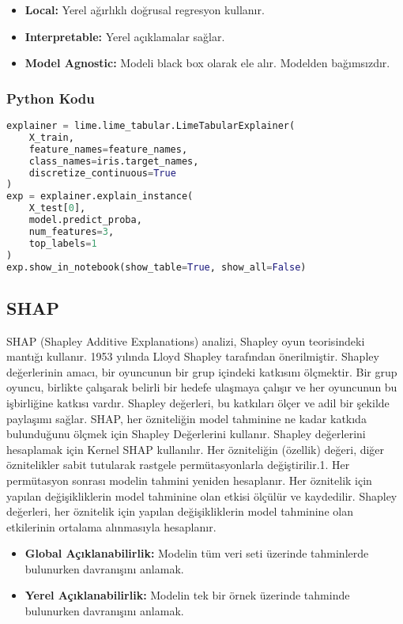 \begin{itemize}
    \item \textbf{Local:} Yerel ağırlıklı doğrusal regresyon kullanır.
    \item \textbf{Interpretable:} Yerel açıklamalar sağlar.
    \item \textbf{Model Agnostic:} Modeli black box olarak ele alır. Modelden bağımsızdır.
\end{itemize}

\subsubsection{Python Kodu}

\begin{lstlisting}[language=Python]
explainer = lime.lime_tabular.LimeTabularExplainer(
	X_train, 
	feature_names=feature_names, 
	class_names=iris.target_names, 
	discretize_continuous=True
)
exp = explainer.explain_instance(
	X_test[0], 
	model.predict_proba, 
	num_features=3, 
	top_labels=1
)
exp.show_in_notebook(show_table=True, show_all=False)
\end{lstlisting}

\newpage

\subsection{SHAP}
SHAP (Shapley Additive Explanations) analizi, Shapley oyun teorisindeki mantığı kullanır. 1953 yılında Lloyd Shapley tarafından önerilmiştir. Shapley değerlerinin amacı, bir oyuncunun bir grup içindeki katkısını ölçmektir. Bir grup oyuncu, birlikte çalışarak belirli bir hedefe ulaşmaya çalışır ve her oyuncunun bu işbirliğine katkısı vardır. Shapley değerleri, bu katkıları ölçer ve adil bir şekilde paylaşımı sağlar. SHAP, her özniteliğin model tahminine ne kadar katkıda bulunduğunu ölçmek için Shapley Değerlerini kullanır. Shapley değerlerini hesaplamak için Kernel SHAP kullanılır. Her özniteliğin (özellik) değeri, diğer öznitelikler sabit tutularak rastgele permütasyonlarla değiştirilir.1. Her permütasyon sonrası modelin tahmini yeniden hesaplanır. Her öznitelik için yapılan değişikliklerin model tahminine olan etkisi ölçülür ve kaydedilir. Shapley değerleri, her öznitelik için yapılan değişikliklerin model tahminine olan etkilerinin ortalama alınmasıyla hesaplanır.

\begin{itemize}
    \item \textbf{Global Açıklanabilirlik:} Modelin tüm veri seti üzerinde tahminlerde bulunurken davranışını anlamak.
    \item \textbf{Yerel Açıklanabilirlik:} Modelin tek bir örnek üzerinde tahminde bulunurken davranışını anlamak.
\end{itemize}

